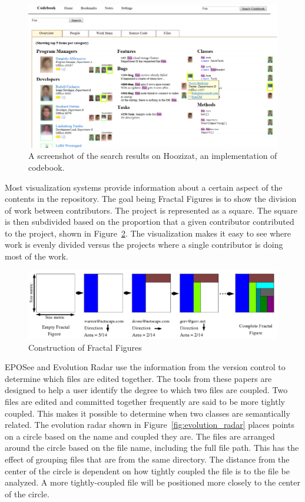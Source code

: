 \begin{figure}[htpb]
  \centering
  \includegraphics[width=0.8\linewidth]{Figures/introduction/codebook.png}
  \caption{A screenshot of the search results on Hoozizat, an
    implementation of codebook.}
  \label{fig:codebook}
\end{figure}

Most visualization systems provide information about a certain aspect of
the contents in the repository. The goal being Fractal
Figures\cite{Ambros2005} is to show the division of work between
contributors. The project is represented as a square. The square is then
subdivided based on the proportion that a given contributor contributed
to the project, shown in Figure~\ref{fig:fractal_figures}. The
visualization makes it easy to see where work is evenly divided versus
the projects where a single contributor is doing most of the work.

\begin{figure}[htpb]
  \centering
  \includegraphics[width=0.8\linewidth]{Figures/introduction/fractal_figures.png}
  \caption{Construction of Fractal Figures}
  \label{fig:fractal_figures}
\end{figure}

EPOSee\cite{Burch2005} and Evolution Radar\cite{Ambros2009} use the
information from the version control to determine which files are edited
together. The tools from these papers are designed to help a user
identify the degree to which two files are coupled. Two files are
edited and committed together frequently are said to be more tightly
coupled. This makes it possible to determine when two classes are
semantically related. The evolution radar shown in
Figure~\ref{fig:evolution_radar} places points on a circle based on the
name and coupled they are. The files are arranged around the circle
based on the file name, including the full file path. This has the
effect of grouping files that are from the same directory. The distance
from the center of the circle is dependent on how tightly coupled the
file is to the file be analyzed. A more tightly-coupled file will be
positioned more closely to the center of the circle.

